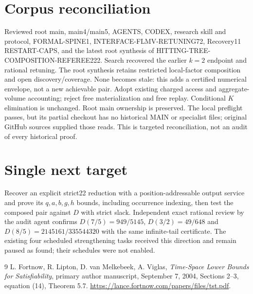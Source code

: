 \documentclass[11pt]{article}
\begin{document}
\section{Corpus reconciliation}
Reviewed root main, main4/main5, AGENTS, CODEX, research skill and protocol,
FORMAL-SPINE1, INTERFACE-FLMV-RETUNING72, Recovery11 RESTART-CAPS,
and the latest root synthesis of HITTING-TREE-COMPOSITION-REFEREE222.
Search recovered the earlier $k=2$ endpoint and rational retuning.
The root synthesis retains restricted local-factor composition and open
discovery/coverage. None becomes stale: this adds a certified numerical
envelope, not a new achievable pair. Adopt existing charged access and
aggregate-volume accounting; reject free materialization and free replay.
Conditional $K$ elimination is unchanged. Root main ownership is preserved.
The local preflight passes, but its partial checkout has no historical
MAIN or specialist files; original GitHub sources supplied those reads.
This is targeted reconciliation, not an audit of every historical proof.

\section{Single next target}
Recover an explicit strict22 reduction with a position-addressable output
service and prove its $q,a,b,g,h$ bounds, including occurrence indexing,
then test the composed pair against $D$ with strict slack.
Independent exact rational review by the audit agent confirms
$D(7/5)=949/5145$, $D(3/2)=49/648$ and
$D(8/5)=2145161/335544320$ with the same infinite-tail certificate.
The existing four scheduled strengthening tasks received this direction
and remain paused as found; their schedules were not enabled.

\begin{thebibliography}{9}
 L. Fortnow, R. Lipton, D. van Melkebeek, A. Viglas,
\emph{Time-Space Lower Bounds for Satisfiability}, primary author manuscript,
September 7, 2004, Sections 2--3, equation (14), Theorem 5.7.
\url{https://lance.fortnow.com/papers/files/tst.pdf}.
\end{thebibliography}
\end{document}
